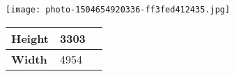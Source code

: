 \documentclass{article}
\begin{document}
\begin{center}
  \texttt{[image: photo-1504654920336-ff3fed412435.jpg]}

\begin{table}[ht]
\begin{tabular}{|M{6.8cm}|M{6.8cm}|N}
\hline
\textbf{Height} & 3303 &\\[20pt]
\hline
\textbf{Width} & 4954 &\\[20pt]
\hline
\end{tabular}
\end{table}


\end{center}
\end{document}
